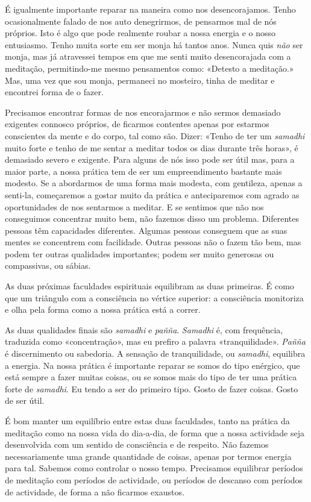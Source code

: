 É igualmente importante reparar na maneira como nos desencorajamos.
Tenho ocasionalmente falado de nos auto denegrirmos, de pensarmos mal de
nós próprios. Isto é algo que pode realmente roubar a nossa energia e o
nosso entusiasmo. Tenho muita sorte em ser monja há tantos anos. Nunca
quis \emph{não} ser monja, mas já atravessei tempos em que me senti
muito desencorajada com a meditação, permitindo-me mesmo pensamentos
como: «Detesto a meditação.» Mas, uma vez que sou monja, permaneci no
mosteiro, tinha de meditar e encontrei forma de o fazer.

Precisamos encontrar formas de nos encorajarmos e não sermos demasiado
exigentes connosco próprios, de ficarmos contentes apenas por estarmos
conscientes da mente e do corpo, tal como são. Dizer: «Tenho de ter um
\emph{samadhi} muito forte e tenho de me sentar a meditar todos os dias
durante três horas», é demasiado severo e exigente. Para alguns de nós
isso pode ser útil mas, para a maior parte, a nossa prática tem de ser
um empreendimento bastante mais modesto. Se a abordarmos de uma forma
mais modesta, com gentileza, apenas a senti-la, começaremos a gostar
muito da prática e anteciparemos com agrado as oportunidades de nos
sentarmos a meditar. E se sentimos que não nos conseguimos concentrar
muito bem, não fazemos disso um problema. Diferentes pessoas têm
capacidades diferentes. Algumas pessoas conseguem que as suas mentes se
concentrem com facilidade. Outras pessoas não o fazem tão bem, mas podem
ter outras qualidades importantes; podem ser muito generosas ou
compassivas, ou sábias.

As duas próximas faculdades espirituais equilibram as duas primeiras. É
como que um triângulo com a consciência no vértice superior: a
consciência monitoriza e olha pela forma como a nossa prática está a
correr.

As duas qualidades finais são \emph{samadhi} e \emph{pañña}.
\emph{Samadhi} é, com frequência, traduzida como «concentração», mas eu
prefiro a palavra «tranquilidade». \emph{Pañña} é discernimento ou
sabedoria. A sensação de tranquilidade, ou \emph{samadhi}, equilibra a
energia. Na nossa prática é importante reparar se somos do tipo
enérgico, que está sempre a fazer muitas coisas, ou se somos mais do
tipo de ter uma prática forte de \emph{samadhi}. Eu tendo a ser do
primeiro tipo. Gosto de fazer coisas. Gosto de ser útil.

É bom manter um equilíbrio entre estas duas faculdades, tanto na prática
da meditação como na nossa vida do dia-a-dia, de forma que a nossa
actividade seja desenvolvida com um sentido de consciência e de
respeito. Não fazemos necessariamente uma grande quantidade de coisas,
apenas por termos energia para tal. Sabemos como controlar o nosso
tempo. Precisamos equilibrar períodos de meditação com períodos de
actividade, ou períodos de descanso com períodos de actividade, de forma
a não ficarmos exaustos.

